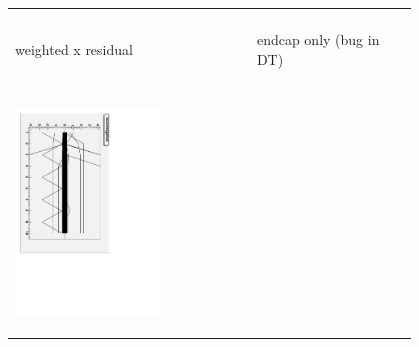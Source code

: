 \documentclass[compress]{beamer}
\begin{document}
\begin{frame}
\begin{center}
\begin{tabular}{p{0.4\linewidth} c p{0.4\linewidth}}
\begin{minipage}{\linewidth}
  \end{minipage} \\
  \begin{minipage}{\linewidth}
    \begin{center}
      weighted x residual
    \end{center}
  \end{minipage} & &
  \begin{minipage}{\linewidth}
    \begin{center}
      endcap only (bug in DT)
    \end{center}
  \end{minipage} \\
  & & \\
  \begin{minipage}{\linewidth}
    \begin{center}
      \includegraphics[height=\linewidth, angle=90]{xconvergence_still_looks_bad.pdf}
    \end{center}
  \end{minipage} & &
  \begin{minipage}{\linewidth}

\end{minipage}
\end{tabular}
\end{center}
\end{frame}
\end{document}
